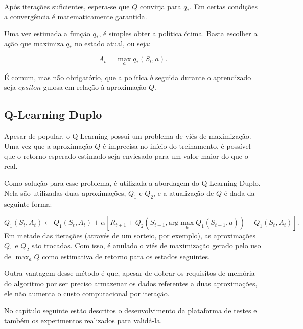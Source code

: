 Após iterações suficientes, espera-se que $Q$ convirja para $q_*$. Em certas condições a convergência é matematicamente garantida.

Uma vez estimada a função $q_*$, é simples obter a política ótima. Basta escolher a ação que maximiza $q_*$ no estado atual, ou seja:

\begin{equation}
A_{t} = \max_{a} q_*(S_t, a).
\end{equation}

É comum, mas não obrigatório, que a política $b$ seguida durante o aprendizado seja $epsilon$-gulosa em relação à aproximação $Q$.

\subsection{Q-Learning Duplo}
\label{subsec:dq-theory}
Apesar de popular, o Q-Learning possui um problema de viés de maximização. Uma vez que a aproximação $Q$ é imprecisa no início do treinamento, é possível que o retorno esperado estimado seja enviesado para um valor maior do que o real.

Como solução para esse problema, é utilizada a abordagem do Q-Learning Duplo. Nela são utilizadas duas aproximações, $Q_1$ e $Q_2$, e a atualização de $Q$ é dada da seguinte forma:

\begin{equation}
\label{eq:doubleq}
Q_1(S_t, A_t) \leftarrow Q_1(S_t, A_t) + \alpha[R_{t+1} + Q_2(S_{t+1}, \text{arg}\max_a Q_1(S_{t+1}, a)) - Q_1(S_t, A_t)].
\end{equation}
% 
Em metade das iterações (através de um sorteio, por exemplo), as aproximações $Q_1$ e $Q_2$ são trocadas. Com isso, é anulado o viés de maximização gerado pelo uso de $\max_a Q$ como estimativa de retorno para os estados seguintes.

Outra vantagem desse método é que, apesar de dobrar os requisitos de memória do algoritmo por ser preciso armazenar os dados referentes a duas aproximações, ele não aumenta o custo computacional por iteração.

No capítulo seguinte estão descritos o desenvolvimento da plataforma de testes e também os experimentos realizados para validá-la.